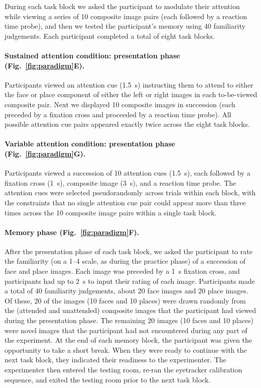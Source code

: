 \documentclass[english]{article}
\begin{document}
During each task block we asked the participant to modulate their attention
while viewing a series of 10 composite image pairs (each followed by a reaction
time probe), and then we tested the participant's memory using 40 familiarity
judgements. Each participant completed a total of eight task blocks.

\paragraph*{Sustained attention condition: presentation phase
(Fig.~\ref{fig:paradigm}E).}

Participants viewed an attention cue (1.5~s) instructing them to attend to
either the face or place component of either the left or right images in each
to-be-viewed composite pair. Next we displayed 10 composite images in
succession (each preceded by a fixation cross and proceeded by a reaction time
probe). All possible attention cue pairs appeared exactly twice across the
eight task blocks.

\paragraph*{Variable attention condition: presentation phase
(Fig.~\ref{fig:paradigm}G).}

Participants viewed a succession of 10 attention cues (1.5~s), each followed by
a fixation cross (1~s), composite image (3~s), and a reaction time probe. The
attention cues were selected pseudorandomly across trials within each block,
with the constraints that no single attention cue pair could appear more than
three times across the 10 composite image pairs within a single task block.

\paragraph*{Memory phase (Fig.~\ref{fig:paradigm}F).}

After the presentation phase of each task block, we asked the participant to
rate the familiarity (on a 1--4 scale, as during the practice phase) of a
succession of face and place images. Each image was preceded by a 1~s fixation
cross, and participants had up to 2~s to input their rating of each image.
Participants made a total of 40 familiarity judgements, about 20 face images
and 20 place images. Of these, 20 of the images (10 faces and 10 places) were
drawn randomly from the (attended and unattended) composite images that the
participant had viewed during the presentation phase. The remaining 20 images
(10 faces and 10 places) were novel images that the participant had not
encountered during any part of the experiment. At the end of each memory block,
the participant was given the opportunity to take a short break. When they were
ready to continue with the next task block, they indicated their readiness to
the experimenter. The experimenter then entered the testing room, re-ran the
eyetracker calibration sequence, and exited the testing room prior to the next
task block.
\end{document}
